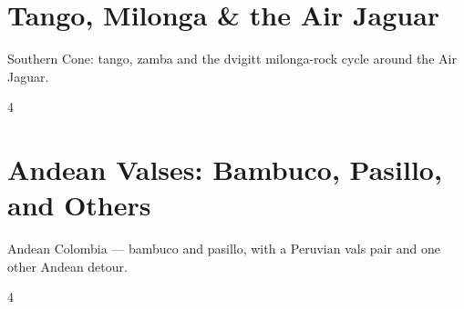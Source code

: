 \documentclass[a4paper,landscape]{memoir}
\begin{document}
\chapter{Tango, Milonga \& the Air Jaguar}
Southern Cone: tango, zamba and the dvigitt milonga-rock cycle around the Air Jaguar.
\clearpage\begin{multicols*}{4}
\end{multicols*}

\chapter{Andean Valses: Bambuco, Pasillo, and Others}
Andean Colombia — bambuco and pasillo, with a Peruvian vals pair and one other Andean detour.
\clearpage\begin{multicols*}{4}
\end{multicols*}
\end{document}
